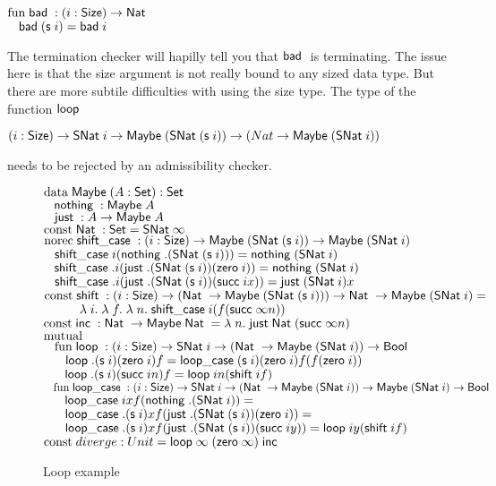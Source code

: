 \begin{bsp}
$\fun \bad : \EPi{i}{\Size}{\Nat}$\\
$\spc \bad (\s i) = \bad i $ 
\end{bsp}
The termination checker will hapilly tell you that $\bad$ is terminating.
The issue here is that the size argument is not really bound to any sized data type.
But there are more subtile difficulties with using the size type.
The type of the function $\lop$
\begin{bsp}
$\EPi{i}{\Size}{\SNat i \ra \Maybe (\SNat (\s i)) \ra (Nat \ra \Maybe (\SNat i))} $ 
\end{bsp}
needs to be rejected by an admissibility checker.
\begin{figure}
$\data \Maybe (A : \Set ) : \Set$\\
$\spc  \nothing : \Maybe A$\\
$\spc  \just : A \ra\Maybe A$\\
$\const \Nat : \Set = \SNat \infty$\\
$\norec \shiftcase : (i : \Size) \ra\Maybe (\SNat (\s i)) \ra\Maybe (\SNat i)$\\
$\spc \shiftcase i (\nothing .(\SNat (\s i))) = \nothing (\SNat i)$\\
$\spc \shiftcase .i (\just .(\SNat (\s i)) (\zero i)) = \nothing (\SNat i)$\\
$\spc \shiftcase .i (\just .(\SNat (\s i)) (\suc i x)) = \just (\SNat i) x$\\
$\const \shift : (i : \Size) \ra(\Nat \ra\Maybe (\SNat (\s i))) \ra\Nat \ra\Maybe (\SNat i) =$\\ 
$\spcx \lam{i}{\lam{f}{\lam{n}{\shiftcase i (f (\suc \infty n))}}}$\\
$\const \inc : \Nat \ra\Maybe \Nat = \lam{n}{\just \Nat (\suc \infty n)}$\\
$\mutual$\\
$\spc \fun \lop : (i : \Size ) \ra\SNat i \ra(\Nat \ra\Maybe (\SNat i)) \ra\Bool$\\
$\spc \spc \lop .(\s i) (\zero i) f = \lopcase (\s i) (\zero i) f (f (\zero i))$\\
$\spc \spc \lop .(\s i) (\suc i n) f = \lop i n (\shift i f)$\\
$\spc \fun \lopcase : (i : \Size ) \ra\SNat i \ra(\Nat \ra\Maybe (\SNat i)) \ra\Maybe (\SNat i) \ra\Bool$\\
$\spc \spc \lopcase i       x f (\nothing .(\SNat i)) = \tt$\\
$\spc \spc \lopcase .(\s i)  x f (\just .(\SNat (\s i))  (\zero i)) = \tt$\\
$\spc \spc \lopcase .(\s i)  x f (\just .(\SNat (\s i)) (\suc i y)) = \lop i y (\shift i f) $\\
$\const diverge : Unit = \lop \infty\; (\zero \infty) \; \inc$\\
\caption{Loop example}
\label{loop}
\end{figure}


